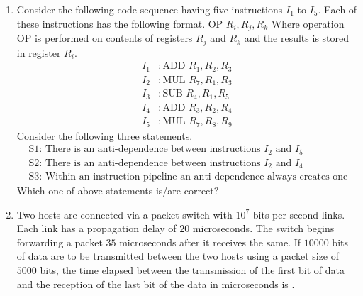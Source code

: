 \documentclass[journal,12pt,onecolumn]{IEEEtran}
\theoremstyle{remark}
\begin{document}
\begin{enumerate}
		\item Consider the following code sequence having five instructions $I_1$ to $I_5$. Each of these instructions has the following format.
		$\text{OP } R_i, R_j, R_k$
		Where operation OP is performed on contents of registers $R_j$ and $R_k$ and the results is stored in register $R_i$.
		\begin{align*}
			I_1 &\colon \text{ADD } R_1, R_2, R_3\\
			I_2 &\colon \text{MUL } R_7, R_1, R_3\\
			I_3 &\colon \text{SUB } R_4, R_1, R_5\\
			I_4 &\colon \text{ADD } R_3, R_2, R_4\\
			I_5 &\colon \text{MUL } R_7, R_8, R_9
		\end{align*}
		Consider the following three statements.
		\begin{align*}
			&\text{S1: There is an anti-dependence between instructions } I_2 \text{ and } I_5\\
			&\text{S2: There is an anti-dependence between instructions } I_2 \text{ and } I_4\\
			&\text{S3: Within an instruction pipeline an anti-dependence always creates one or more stalls}
		\end{align*}
		Which one of above statements is/are correct?
		
		\hfill{}
		
		\begin{enumerate}
		\end{enumerate}
		
		\item Two hosts are connected via a packet switch with $10^7$ bits per second links. Each link has a propagation delay of $20$ microseconds. The switch begins forwarding a packet $35$ microseconds after it receives the same. If $10000$ bits of data are to be transmitted between the two hosts using a packet size of $5000$ bits, the time elapsed between the transmission of the first bit of data and the reception of the last bit of the data in microseconds is \underline{\hspace{2cm}}.
		

\end{enumerate}
\end{document}
